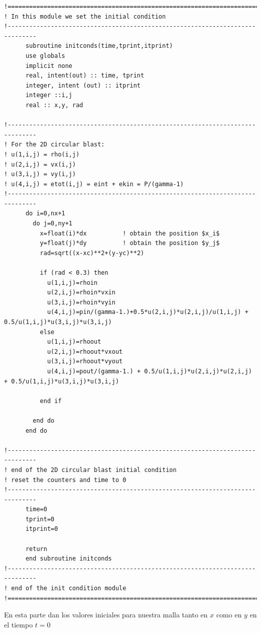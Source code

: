 \documentclass[12pt,a4paper]{book}
\begin{document}
\begin{lstlisting}[frame=single] 
!==============================================================================
! In this module we set the initial condition
!------------------------------------------------------------------------------
      subroutine initconds(time,tprint,itprint)
      use globals
      implicit none
      real, intent(out) :: time, tprint
      integer, intent (out) :: itprint
      integer ::i,j
      real :: x,y, rad

!------------------------------------------------------------------------------
! For the 2D circular blast:
! u(1,i,j) = rho(i,j)
! u(2,i,j) = vx(i,j)
! u(3,i,j) = vy(i,j)
! u(4,i,j) = etot(i,j) = eint + ekin = P/(gamma-1)
!------------------------------------------------------------------------------
      do i=0,nx+1
        do j=0,ny+1
          x=float(i)*dx          ! obtain the position $x_i$
          y=float(j)*dy          ! obtain the position $y_j$
          rad=sqrt((x-xc)**2+(y-yc)**2)

          if (rad < 0.3) then
            u(1,i,j)=rhoin
            u(2,i,j)=rhoin*vxin
            u(3,i,j)=rhoin*vyin
            u(4,i,j)=pin/(gamma-1.)+0.5*u(2,i,j)*u(2,i,j)/u(1,i,j) + 0.5/u(1,i,j)*u(3,i,j)*u(3,i,j)
          else
            u(1,i,j)=rhoout
            u(2,i,j)=rhoout*vxout
            u(3,i,j)=rhoout*vyout
            u(4,i,j)=pout/(gamma-1.) + 0.5/u(1,i,j)*u(2,i,j)*u(2,i,j) + 0.5/u(1,i,j)*u(3,i,j)*u(3,i,j)

          end if

        end do
      end do

!------------------------------------------------------------------------------
! end of the 2D circular blast initial condition
! reset the counters and time to 0
!------------------------------------------------------------------------------
      time=0
      tprint=0
      itprint=0

      return
      end subroutine initconds
!------------------------------------------------------------------------------
! end of the init condition module
!==============================================================================

\end{lstlisting}
En esta parte dan los valores iniciales para nuestra malla tanto en $x$ como en $y$ en el tiempo $t=0$

\end{document}
